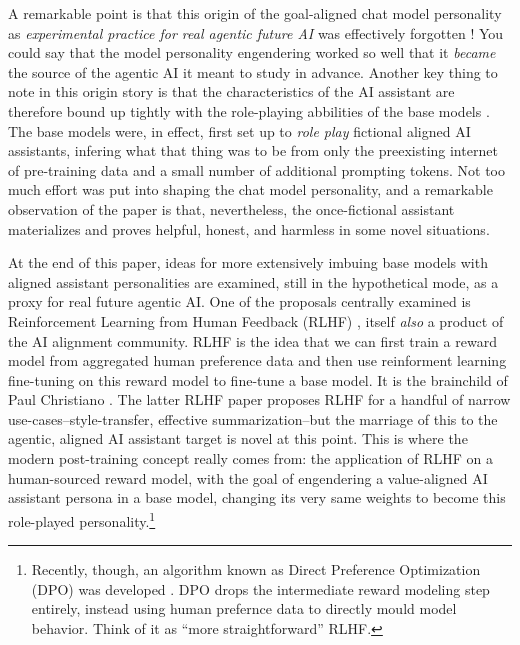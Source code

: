 A remarkable point is that this origin of the goal-aligned chat model
personality as \emph{experimental practice for real agentic future AI} was
effectively forgotten \cite{nostalgebraist2025void}! You could say that the
model personality engendering worked so well that it \emph{became} the source
of the agentic AI it meant to study in advance. Another key thing to note in
this origin story is that the characteristics of the AI assistant are therefore
bound up tightly with the role-playing abbilities of the base models
\cite{nostalgebraist2025void}. The base models were, in effect, first set up to
\emph{role play} fictional aligned AI assistants, infering what that thing was
to be from only the preexisting internet of pre-training data and a small
number of additional prompting tokens. Not too much effort was put into shaping
the chat model personality, and a remarkable observation of the paper is that,
nevertheless, the once-fictional assistant materializes and proves helpful,
honest, and harmless in some novel situations.

At the end of this paper, ideas for more extensively imbuing base models with
aligned assistant personalities are examined, still in the hypothetical mode,
as a proxy for real future agentic AI. One of the proposals centrally examined
is Reinforcement Learning from Human Feedback (RLHF)
\cite{christiano2017human,bai2022training,ziegler2019human}, itself \emph{also}
a product of the AI alignment community. RLHF is the idea that we can first
train a reward model from aggregated human preference data and then use
reinforment learning fine-tuning on this reward model to fine-tune a base
model. It is the brainchild of Paul Christiano \cite{christiano2017human}. The
latter RLHF paper proposes RLHF for a handful of narrow
use-cases--style-transfer, effective summarization--but the marriage of this to
the agentic, aligned AI assistant target is novel at this point. This is where
the modern post-training concept really comes from: the application of RLHF on
a human-sourced reward model, with the goal of engendering a value-aligned AI
assistant persona in a base model, changing its very same weights to become
this role-played personality.\footnote{Recently, though, an algorithm known as
Direct Preference Optimization (DPO) was developed \cite{rafailov2024dpo}. DPO
drops the intermediate reward modeling step entirely, instead using human
prefernce data to directly mould model behavior. Think of it as ``more
straightforward'' RLHF. }

